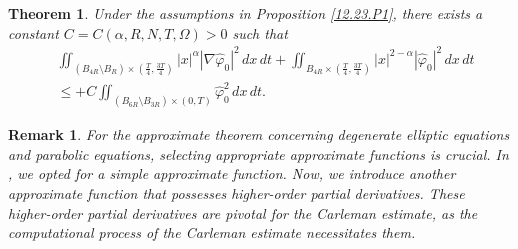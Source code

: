 \documentclass[11pt]{article}
\newtheorem{remark}{Remark}[section]
\newtheorem{theorem}{Theorem}[section]
\numberwithin{equation}{section}
\begin{document}
\begin{theorem}\label{12.25.T1}
Under the assumptions in Proposition \ref{12.23.P1}, there exists a constant $C=C(\alpha, R, N, T,\Omega)>0$ such that
\begin{equation*}
\begin{split}
&\iint_{(B_{4R}\setminus B_R)\times \left(\frac{T}{4}, \frac{3T}{4}\right)}|x|^\alpha |\nabla \widehat{\varphi}_0|^2\,dx\,dt+\iint_{B_{4R}\times \left(\frac{T}{4}, \frac{3T}{4}\right)} |x|^{2-\alpha}|\widehat{\varphi}_0|^2\,dx\,dt\\
&\leq +C\iint_{(B_{6R}\setminus B_{3R})\times (0,T)} \widehat{\varphi}_0^2\,dx\,dt.
\end{split}
\end{equation*}
\end{theorem}

\begin{remark}
	 For the approximate theorem concerning degenerate elliptic equations and parabolic equations, selecting appropriate approximate functions is crucial. In \cite{Wu1}, we opted for a simple approximate function. Now, we introduce another approximate function that possesses higher-order partial derivatives. These higher-order partial derivatives are pivotal for the Carleman estimate, as the computational process of the Carleman estimate necessitates them.
\end{remark}
\end{document}
